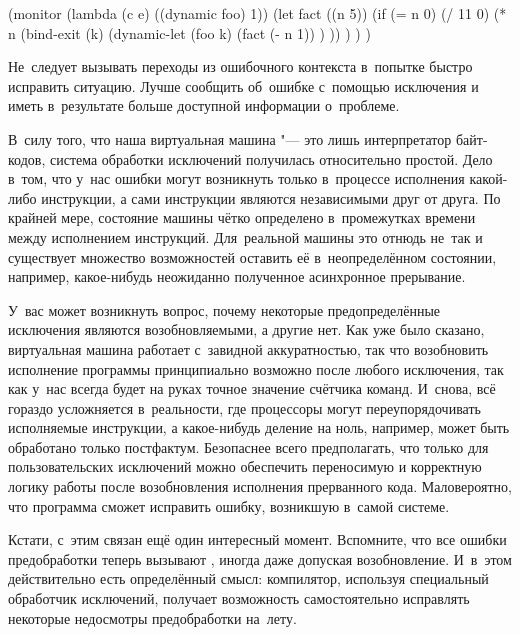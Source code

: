 \begin{code:lisp}
(monitor (lambda (c e) ((dynamic foo) 1))
  (let fact ((n 5))
    (if (= n 0) (/ 11 0)
        (* n (bind-exit (k)
               (dynamic-let (foo k)
                 (fact (- n 1)) ) )) ) ) )
\end{code:lisp}

Не~следует вызывать переходы из ошибочного контекста в~попытке быстро исправить
ситуацию. Лучше сообщить об~ошибке с~помощью исключения и иметь в~результате
больше доступной информации о~проблеме.

В~силу того, что наша виртуальная машина "--- это лишь интерпретатор байт-кодов,
система обработки исключений получилась относительно простой. Дело в~том, что
у~нас ошибки могут возникнуть только в~процессе исполнения какой-либо
инструкции, а сами инструкции являются независимыми друг от друга. По крайней
мере, состояние машины чётко определено в~промежутках времени между исполнением
инструкций. Для~реальной машины это отнюдь не~так и существует множество
возможностей оставить её в~неопределённом состоянии, например, какое-нибудь
неожиданно полученное асинхронное прерывание.

У~вас может возникнуть вопрос, почему некоторые предопределённые исключения
являются возобновляемыми, а другие нет. Как уже было сказано, виртуальная машина
работает с~завидной аккуратностью, так что возобновить исполнение программы
принципиально возможно после любого исключения, так как у~нас всегда будет на
руках точное значение счётчика команд. И~снова, всё гораздо усложняется
в~реальности, где процессоры могут переупорядочивать исполняемые инструкции, а
какое-нибудь деление на ноль, например, может быть обработано только постфактум.
Безопаснее всего предполагать, что только для пользовательских исключений можно
обеспечить переносимую и корректную логику работы после возобновления исполнения
прерванного кода. Маловероятно, что программа сможет исправить ошибку, возникшую
в~самой системе.

Кстати, с~этим связан ещё один интересный момент. Вспомните, что все ошибки
предобработки теперь вызывают , иногда даже допуская
возобновление. И~в~этом действительно есть определённый смысл: компилятор,
используя специальный обработчик исключений, получает возможность самостоятельно
исправлять некоторые недосмотры предобработки на~лету.


